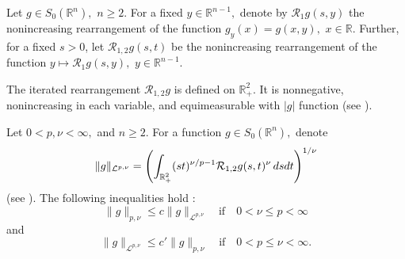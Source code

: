 \documentclass[12pt,twoside,reqno]{amsart}
\numberwithin{equation}{section}
\theoremstyle{definition}
\numberwithin{equation}{section}
\def\R{\mathbb{R}}
\begin{document}
Let $g\in S_0(\R^n), \,\, n\ge 2.$ For a fixed $y\in\R^{n-1},$ denote by $\mathcal R_1 g(s,y)$ the nonincreasing rearrangement of the function $g_y(x)=g(x,y), \,\, x\in \R.$ Further, for a fixed $s>0$, let $\mathcal R_{1,2}g(s,t)$ be the nonincreasing rearrangement of the function $y\mapsto \mathcal R_1 g(s,y),\,\,y\in\R^{n-1}.$

    The iterated rearrangement
$\mathcal R_{1,2} g$  is defined on $\R_+^2.$ It is nonnegative, nonincreasing in each variable,
and equimeasurable
with  $|g|$ function (see \cite{Bl, K01, K07}).



 Let $0<p, \nu<\infty,$ and $n\ge 2$.  For a function $g\in S_0(\R^n),$ denote
$$
\| g\| _{\mathcal L^{p,\nu}}=\left(\int_{\Bbb R _+^2}
(st)^{\nu/p-1}\mathcal R_{1,2}g(s,t)^\nu\,ds
dt\right) ^{1/\nu}
$$
(see \cite{Bl}).
The following inequalities hold \cite{Ya}:
\begin{equation}\label{const1}
\| g\| _{p,\nu}\le  c\| g\|
_{\mathcal L^{p,\nu}}\quad\text{if}\quad 0<\nu\le p<\infty
\end{equation}
and
\begin{equation}\label{const2}
\| g\| _{\mathcal L^{p,\nu}}\le  c'\| g\|
_{p,\nu}\quad\text{if}\quad 0<p\le \nu<\infty.
\end{equation}
\end{document}
